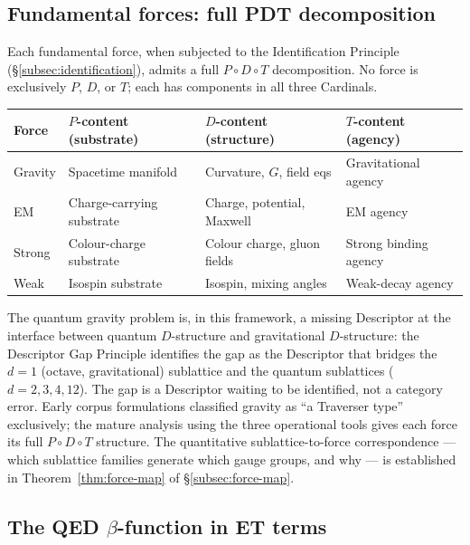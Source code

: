 \documentclass[11pt,a4paper]{article}
\theoremstyle{definition}
\theoremstyle{remark}
\begin{document}
\subsection{Fundamental forces: full PDT decomposition}\label{subsec:forces-PDT}

Each fundamental force, when subjected to the Identification Principle (\S\ref{subsec:identification}), admits a full $P \circ D \circ T$ decomposition. No force is exclusively $P$, $D$, or $T$; each has components in all three Cardinals.

\begin{center}
\small
\begin{tabular}{llll}
\toprule
\textbf{Force} & \textbf{$P$-content (substrate)} & \textbf{$D$-content (structure)} & \textbf{$T$-content (agency)} \\
\midrule
Gravity & Spacetime manifold & Curvature, $G$, field eqs & Gravitational agency \\
EM & Charge-carrying substrate & Charge, potential, Maxwell & EM agency \\
Strong & Colour-charge substrate & Colour charge, gluon fields & Strong binding agency \\
Weak & Isospin substrate & Isospin, mixing angles & Weak-decay agency \\
\bottomrule
\end{tabular}
\end{center}

The quantum gravity problem is, in this framework, a missing Descriptor at the interface between quantum $D$-structure and gravitational $D$-structure: the Descriptor Gap Principle identifies the gap as the Descriptor that bridges the $d = 1$ (octave, gravitational) sublattice and the quantum sublattices ($d = 2, 3, 4, 12$). The gap is a Descriptor waiting to be identified, not a category error. Early corpus formulations classified gravity as ``a Traverser type'' exclusively; the mature analysis using the three operational tools gives each force its full $P \circ D \circ T$ structure. The quantitative sublattice-to-force correspondence --- which sublattice families generate which gauge groups, and why --- is established in Theorem~\ref{thm:force-map} of \S\ref{subsec:force-map}.

\subsection{The QED $\beta$-function in ET terms}\label{subsec:QED-beta}
\end{document}
